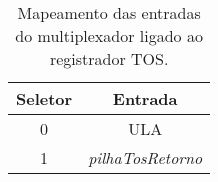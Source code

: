 \begin{table}[]
\centering
\begin{tabular}{|c|c|}
\hline
\textbf{Seletor} & \textbf{Entrada}         \\ \hline
0       & ULA             \\ \hline
1       & \textit{pilhaTosRetorno} \\ \hline
\end{tabular}
\caption{Mapeamento das entradas do multiplexador ligado ao registrador TOS.}
\label{table_muxTos}
\end{table}